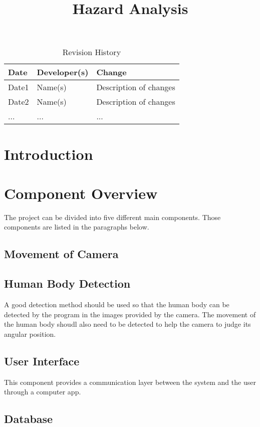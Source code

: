 \documentclass{article}
\title{Hazard Analysis\\\progname}
\author{\authname}
\date{}
\begin{document}
\begin{table}[hp]
\caption{Revision History} \label{TblRevisionHistory}
\begin{tabularx}{\textwidth}{llX}
\toprule
\textbf{Date} & \textbf{Developer(s)} & \textbf{Change}\\
\midrule
Date1 & Name(s) & Description of changes\\
Date2 & Name(s) & Description of changes\\
... & ... & ...\\
\bottomrule
\end{tabularx}
\end{table}

\newpage

\maketitle

\newpage


\tableofcontents

\newpage
\section{Introduction}

\section{Component Overview}
The project can be divided into five different main components. Those components are listed in the paragraphs below. 
\subsection{Movement of Camera}
\subsection{Human Body Detection}
A good detection method should be used so that the human body can be detected by the program in the images provided by the camera. The movement of the human body shoudl also need to be detected to help the camera to judge its angular position. 
\subsection{User Interface}
This component provides a communication layer between the system and the user through a computer app.
\subsection{Database}
\end{document}
